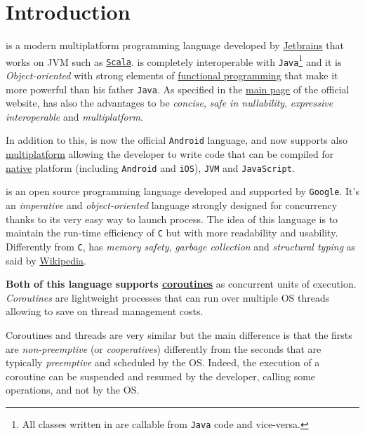 \section{Introduction}

\Kotlin is a modern multiplatform programming language developed by \href{https://www.jetbrains.com/}{Jetbrains} that works on JVM such as \href{www.scala-lang.org}{\texttt{Scala}}.
\Kotlin is completely interoperable with \texttt{Java}\footnote{All classes written in \Kotlin are callable from \texttt{Java} code and vice-versa.} and it is \textit{Object-oriented} with strong elements of \href{https://en.wikipedia.org/wiki/Functional_programming}{functional programming} that make it more powerful than his father \texttt{Java}.
As specified in the \href{https://kotlinlang.org/#why-kotlin}{main page} of the official website, \Kotlin has also the advantages to be \textit{concise}, \textit{safe in nullability}, \textit{expressive} \textit{interoperable} and \textit{multiplatform}.

In addition to this, \Kotlin is now the official \texttt{Android} language, and now supports also \href{https://kotlinlang.org/docs/multiplatform.html}{multiplatform} allowing the developer to write \Kotlin code that can be compiled for \href{https://kotlinlang.org/docs/native-overview.html}{native} platform (including \texttt{Android} and \texttt{iOS}), \texttt{JVM} and \texttt{JavaScript}.

\Go is an open source programming language developed and supported by \texttt{Google}.
It's an \textit{imperative} and \textit{object-oriented} language strongly designed for concurrency thanks to its very easy way to launch process.
The idea of this language is to maintain the run-time efficiency of \texttt{C} but with more readability and usability. Differently from \texttt{C}, \Go has \textit{memory safety}, \textit{garbage collection} and \textit{structural typing} as said by \href{https://en.wikipedia.org/wiki/Go_(programming_language)}{Wikipedia}.

\textbf{Both of this language supports \href{https://en.wikipedia.org/wiki/Coroutine}{coroutines}} as concurrent units of execution. \textit{Coroutines} are lightweight processes that can run over multiple OS threads allowing to save on thread management costs.

Coroutines and threads are very similar but the main difference is that the firsts are \textit{non-preemptive} (or \textit{cooperatives}) differently from the seconds that are typically \textit{preemptive} and scheduled by the OS. Indeed, the execution of a coroutine can be suspended and resumed by the developer, calling some operations, and not by the OS.